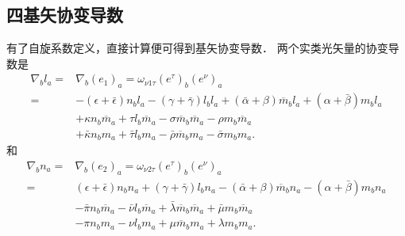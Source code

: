 \subsection{四基矢协变导数}
有了自旋系数定义，直接计算便可得到基矢协变导数．
两个实类光矢量的协变导数是
\begin{equation}\label{chnull:eqn_covD-l}
    \begin{aligned}
        \nabla_{b} l_a =& \nabla_{b} (e_1)_a =
        \omega_{\nu 1 \tau}(e^\tau)_b (e^\nu)_a  \\
        =& -(\epsilon+\bar{\epsilon}) n_b l_a -(\gamma+\bar{\gamma}) l_b l_a
        +(\bar{\alpha}+\beta) \overline{m}_b l_a + (\alpha+\bar{\beta}) m_b l_a  \\
        & +\kappa n_b \overline{m}_a  +\tau l_b \overline{m}_a
        -\sigma \overline{m}_b \overline{m}_a  -\rho m_b \overline{m}_a  \\
        & +\bar{\kappa} n_b m_a + \bar{\tau} l_b m_a
        -\bar{\rho} \overline{m}_b m_a -\bar{\sigma} m_b m_a  .
    \end{aligned}
\end{equation}
和
\begin{equation}\label{chnull:eqn_covD-n}
    \begin{aligned}
        \nabla_{b} n_a =& \nabla_{b} (e_2)_a =
        \omega_{\nu 2 \tau}(e^\tau)_b (e^\nu)_a  \\
        =& (\epsilon+\bar{\epsilon}) n_b n_a + (\gamma+\bar{\gamma}) l_b n_a
        -(\bar{\alpha}+\beta)\overline{m}_b n_a - (\alpha+\bar{\beta})m_b n_a  \\
        & -\bar{\pi} n_b \overline{m}_a  -\bar{\nu} l_b \overline{m}_a
        +\bar{\lambda}\overline{m}_b \overline{m}_a  +\bar{\mu}m_b \overline{m}_a  \\
        & -\pi n_b m_a -\nu l_b m_a
        +\mu \overline{m}_b m_a+\lambda m_b m_a .
    \end{aligned}
\end{equation}
